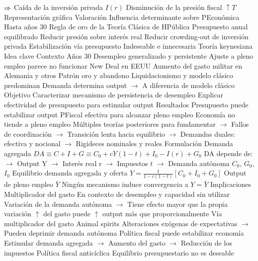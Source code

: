 \documentclass{nuevotema}
\begin{document}
\begin{esquemal}
				\4[] $\Rightarrow$ Caída de la inversión privada $I(r)$
				\4[] Disminución de la presión fiscal $\uparrow T$
				\4 Representación gráfica
				\4[] 
			\3 Valoración
				\4 Influencia determinante sobre PEconómica
				\4[] Hasta años 30
				\4 Regla de oro de la Teoría Clásica de HPública
				\4[] Presupuesto anual equilibrado
				\4[] Reducir presión sobre interés real
				\4[] Reducir crowding-out de inversión privada
				\4 Estabilización vía presupuesto
				\4[] Indeseable e innecesaria
		\2 Teoría keynesiana
			\3 Idea clave
				\4 Contexto
				\4[] Años 30
				\4[] Desempleo generalizado y persistente
				\4[] Ajuste a pleno empleo parece no funcionar
				\4[] New Deal en EEUU
				\4[] Aumento del gasto militar en Alemania y otros
				\4[] Patrón oro y abandono
				\4[] Liquidacionismo y modelo clásico predominan
				\4[] Demanda determina output
				\4[] $\to$ A diferencia de modelo clásico
				\4 Objetivo
				\4[] Caracterizar mecanismo de persistencia de desempleo
				\4[] Explicar efectividad de presupuesto para estimular output
				\4 Resultados
				\4[] Presupuesto puede estabilizar output
				\4[] PFiscal efectiva para alcanzar pleno empleo
				\4[] Economía no tiende a pleno empleo
				\4[] Múltiples teorías posteriores para fundamentar
				\4[] $\to$ Fallos de coordinación
				\4[] $\to$ Transición lenta hacia equilibrio
				\4[] $\to$ Demandas duales: efectiva y nocional
				\4[] $\to$ Rigideces nominales y reales
			\3 Formulación
				\4 Demanda agregada
				\4[] $DA \equiv C+I+G\equiv C_0 + cY(1-t) + I_0 - I(r) + G_0$
				\4[] DA depende de:
				\4[] $\to$ Output Y
				\4[] $\to$ Interés real r
				\4[] $\to$ Impuestos $t$
				\4[] $\to$ Demanda autónoma $C_0$, $G_0$, $I_0$
				\4 Equilibrio demanda agregada y oferta
				\4[] $Y = \frac{1}{1-c(1-t)}\left[ C_0 + I_0 + G_0 \right]$
				\4 Output de pleno empleo $\bar{Y}$
				\4[] Ningún mecanismo induce convergencia a $Y=\bar{Y}$
			\3 Implicaciones
				\4 Multiplicador del gasto
				\4[] En contexto de desempleo y capacidad sin utilizar
				\4[] Variación de la demanda autónoma
				\4[] $\to$ Tiene efecto mayor que la propia variación
				\4 $\uparrow$ del gasto puede $\uparrow$ output más que proporcionalmente
				\4[] Vía multiplicador del gasto
				\4 Animal spirits
				\4[] Alteraciones exógenas de expectativas
				\4[] $\to$ Pueden deprimir demanda autónoma
				\4 Política fiscal puede estabilizar economía
				\4[] Estimular demanda agregada
				\4[] $\to$ Aumento del gasto
				\4[] $\to$ Reducción de los impuestos
				\4 Política fiscal anticíclica
				\4[] Equilibrio presupuestario no es deseable

\end{esquemal}
\end{document}
